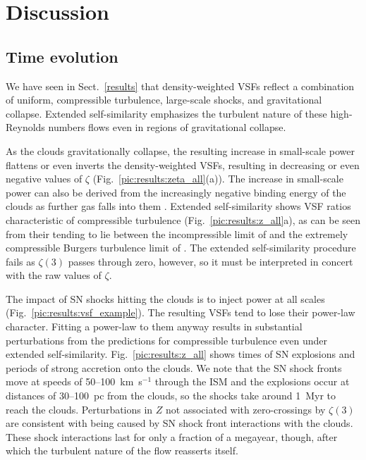 \documentclass{aa}		%
\begin{document}
\section{Discussion}\label{discussion}

\subsection{Time evolution}\label{discussion:normal}

We have seen in Sect.~\ref{results} that density-weighted VSFs reflect a combination of uniform, compressible turbulence, large-scale shocks, and gravitational collapse.  Extended self-similarity emphasizes the turbulent nature of these high-Reynolds numbers flows even in regions of gravitational collapse. 

As the clouds gravitationally collapse, the resulting increase in small-scale power flattens or even inverts the density-weighted VSFs, resulting in decreasing or even negative values of $\zeta$ (Fig.~\ref{pic:results:zeta_all}(a)). The increase in small-scale power can also be derived from the increasingly negative binding energy of the clouds as further gas falls into them .  Extended self-similarity shows VSF ratios characteristic of compressible turbulence (Fig.~\ref{pic:results:z_all}a), as can be seen from their tending to lie between the incompressible limit of \citet{She1994} and the extremely compressible Burgers turbulence limit of \citet{Boldyrev2002}.  The extended self-similarity procedure fails as $\zeta(3)$ passes through zero, however, so it must be interpreted in concert with the raw values of $\zeta$.

The impact of SN shocks hitting the clouds is to inject power at all scales (Fig.~\ref{pic:results:vsf_example}).  The resulting VSFs tend to lose their power-law character. Fitting a power-law to them anyway results in substantial perturbations from the predictions for compressible turbulence even under extended self-similarity.  Fig.~\ref{pic:results:z_all} shows times of SN explosions and periods of strong accretion onto the clouds.  We note that the SN shock fronts move at speeds of 50--100~km~s$^{-1}$ through the ISM and the explosions occur at distances of 30--100~pc from the clouds, so the shocks take around 1~Myr to reach the clouds. Perturbations in $Z$ not associated with zero-crossings by $\zeta(3)$ are consistent with being caused by SN shock front interactions with the clouds.  These shock interactions last for only a fraction of a megayear, though, after which the turbulent nature of the flow reasserts itself.
\end{document}

